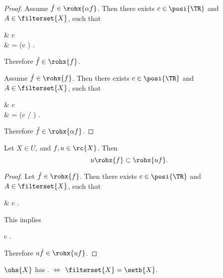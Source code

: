 \documentclass[b5paper, english, oneside]{memoir}
\begin{document}
\begin{proof}
\proofpart{$\subset$}
Assume $\hat{f} \in \rohx{\alpha f}$. Then there exists $c \in \posi{\TR}$ and $A \in \filterset{X}$, such that
\begin{eqs}
 & \lt c  \\
{} & = (c \alpha) .
\end{eqs}
Therefore $\hat{f} \in \rohx{f}$. 

\proofpart{$\supset$}
Assume $\hat{f} \in \rohx{f}$. Then there exists $c \in \posi{\TR}$ and $A \in \filterset{X}$, such that
\begin{eqs}
 & \lt c  \\
{} & = (c / \alpha) .
\end{eqs}
Therefore $\hat{f} \in \rohx{\alpha f}$.

\end{proof}

\begin{theorem}
\label{LocalSubHomogenuity}
Let $X \in U$, and $f, u \in \rc{X}$. Then 
\begin{equation}
u \rohx{f} \subset \rohx{uf}.
\end{equation}
\end{theorem}

\begin{proof}
Let $\hat{f} \in \rohx{f}$. Then there exists $c \in \posi{\TR}$ and $A \in \filterset{X}$, such that
\begin{eqs}
 & \lt c .
\end{eqs}
This implies
\begin{eqs}
 \lt c .
\end{eqs}
Therefore $u\hat{f} \in \rohx{uf}$.
\end{proof}

\begin{theorem}
\label{LocalSuperHomogenuityCharacterized}
$\ohs{X}$ has . $\iff$ $\filterset{X} = \setb{X}$.
\end{theorem}
\end{document}
